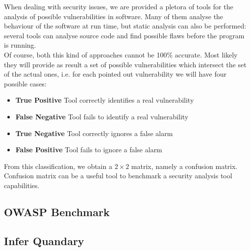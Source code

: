 \documentclass[../Report.tex]{subfiles}
\begin{document}
When dealing with security issues, we are provided a pletora of tools for the analysis of possible vulnerabilities in software. Many of them analyse the behaviour of the software at run time, but static analysis can also be performed: several tools can analyse source code and find possible flaws before the program is running. \\
Of course, both this kind of approaches cannot be 100\% accurate. Most likely they will provide as result a set of possible vulnerabilities which intersect the set of the actual ones, i.e. for each pointed out vulnerability we will have four possible cases:

\begin{itemize}
	\item \textbf{True Positive} Tool correctly identifies a real vulnerability
	\item \textbf{False Negative} Tool fails to identify a real vulnerability
	\item \textbf{True Negative} Tool correctly ignores a false alarm
	\item \textbf{False Positive} Tool fails to ignore a false alarm
\end{itemize}

From this classification, we obtain a $2 \times 2$ matrix, namely a confusion matrix. Confusion matrix can be a useful tool to benchmark a security analysis tool capabilities. \\

\subsection{OWASP Benchmark}\label{sub:owasp}



\subsection{Infer Quandary}\label{sub:infer}


\end{document}
